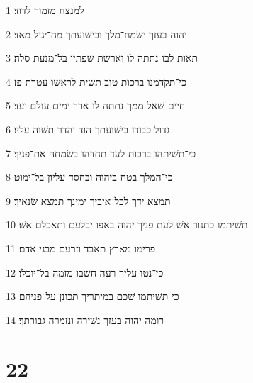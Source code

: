 \par 1 למנצח מזמור לדוד׃
\par 2 יהוה בעזך ישׂמח־מלך ובישׁועתך מה־יגיל מאד׃
\par 3 תאות לבו נתתה לו וארשׁת שׂפתיו בל־מנעת סלה׃
\par 4 כי־תקדמנו ברכות טוב תשׁית לראשׁו עטרת פז׃
\par 5 חיים שׁאל ממך נתתה לו ארך ימים עולם ועד׃
\par 6 גדול כבודו בישׁועתך הוד והדר תשׁוה עליו׃
\par 7 כי־תשׁיתהו ברכות לעד תחדהו בשׂמחה את־פניך׃
\par 8 כי־המלך בטח ביהוה ובחסד עליון בל־ימוט׃
\par 9 תמצא ידך לכל־איביך ימינך תמצא שׂנאיך׃
\par 10 תשׁיתמו כתנור אשׁ לעת פניך יהוה באפו יבלעם ותאכלם אשׁ׃
\par 11 פרימו מארץ תאבד וזרעם מבני אדם׃
\par 12 כי־נטו עליך רעה חשׁבו מזמה בל־יוכלו׃
\par 13 כי תשׁיתמו שׁכם במיתריך תכונן על־פניהם׃
\par 14 רומה יהוה בעזך נשׁירה ונזמרה גבורתך׃

\chapter{22}

